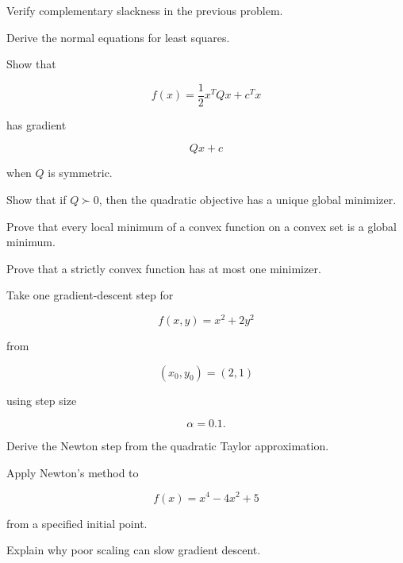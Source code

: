 \begin{exercise}[3]
Verify complementary slackness in the previous problem.
\end{exercise}

\begin{exercise}[3]
Derive the normal equations for least squares.
\end{exercise}

\begin{exercise}[3]
Show that

\[
f(x)
=
\frac12x^TQx+c^Tx
\]

has gradient

\[
Qx+c
\]

when \(Q\) is symmetric.
\end{exercise}

\begin{exercise}[3]
Show that if \(Q\succ0\), then the quadratic objective has a unique
global minimizer.
\end{exercise}

\begin{exercise}[3]
Prove that every local minimum of a convex function on a convex set is a
global minimum.
\end{exercise}

\begin{exercise}[3]
Prove that a strictly convex function has at most one minimizer.
\end{exercise}

\begin{exercise}[3]
Take one gradient-descent step for

\[
f(x,y)
=
x^2+2y^2
\]

from

\[
(x_0,y_0)=(2,1)
\]

using step size

\[
\alpha=0.1.
\]
\end{exercise}

\begin{exercise}[3]
Derive the Newton step from the quadratic Taylor approximation.
\end{exercise}

\begin{exercise}[3]
Apply Newton's method to

\[
f(x)=x^4-4x^2+5
\]

from a specified initial point.
\end{exercise}

\begin{exercise}[3]
Explain why poor scaling can slow gradient descent.
\end{exercise}

